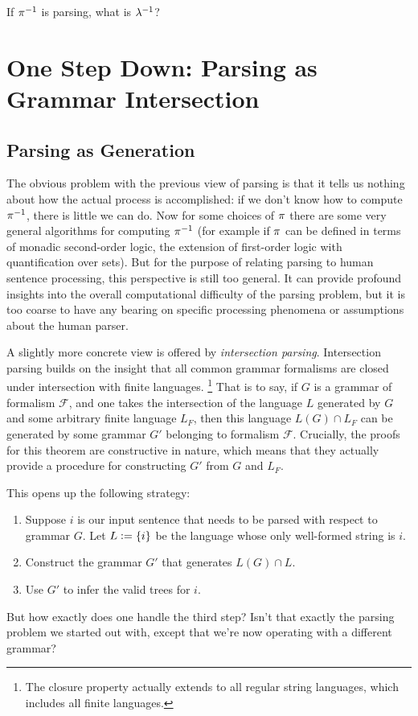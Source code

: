 \begin{exercise}
    If $ \pi^{-1} $ is parsing, what is $ \lambda^{-1} $?
\end{exercise}


\section{One Step Down: Parsing as Grammar Intersection}
\label{sec:ParserOverview_IntersectionParsing}

\subsection{Parsing as Generation}
The obvious problem with the previous view of parsing is that it tells us nothing about how the actual process is accomplished: if we don't know how to compute $ \pi^{-1} $, there is little we can do.
Now for some choices of $\pi$ there are some very general algorithms for computing $ \pi^{-1} $ (for example if $\pi$ can be defined in terms of monadic second-order logic, the extension of first-order logic with quantification over sets).
But for the purpose of relating parsing to human sentence processing, this perspective is still too general.
It can provide profound insights into the overall computational difficulty of the parsing problem, but it is too coarse to have any bearing on specific processing phenomena or assumptions about the human parser.

A slightly more concrete view is offered by \emph{intersection parsing}.
Intersection parsing builds on the insight that all common grammar formalisms are closed under intersection with finite languages.%
\footnote{
    The closure property actually extends to all regular string languages, which includes all finite languages.
}
That is to say, if $G$ is a grammar of formalism $\mathcal{F}$, and one takes the intersection of the language $L$ generated by $G$ and some arbitrary finite language $L_F$, then this language $L(G) \cap L_F$ can be generated by some grammar $G'$ belonging to formalism $\mathcal{F}$.
Crucially, the proofs for this theorem are constructive in nature, which means that they actually provide a procedure for constructing $G'$ from $G$ and $L_F$.

This opens up the following strategy:
%
\begin{enumerate}
    \item Suppose $i$ is our input sentence that needs to be parsed with respect to grammar $G$.
        Let $L \mathrel{\mathop:}= \left \{ i \right \}$ be the language whose only well-formed string is $i$.
    \item Construct the grammar $G'$ that generates $L(G) \cap L$.
    \item Use $G'$ to infer the valid trees for $i$.
\end{enumerate}
%
But how exactly does one handle the third step?
Isn't that exactly the parsing problem we started out with, except that we're now operating with a different grammar?

